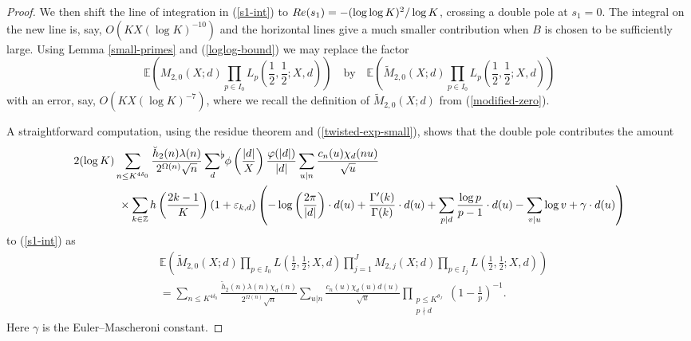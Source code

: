 \documentclass[10pt,a4paper]{amsart}
\renewcommand{\Re}{\textnormal{Re}}
\newcommand\Z{\mathbb{Z}}
\newcommand\eps{\varepsilon}
\newcommand{\sumflat}{\mathop{{\sum}^{\raisebox{-3pt}{\makebox[0pt][l]{$\flat$}}}}}
\begin{document}
\begin{proof}
We then shift the line of integration in (\ref{s1-int}) to $\Re(s_1)=-(\log\log K)^2/\log K$, crossing a double pole at $s_1=0$. The integral on the new line is, say, $O(KX(\log K)^{-10})$ and the horizontal lines give a much smaller contribution when $B$ is chosen to be sufficiently large. Using Lemma \ref{small-primes} and (\ref{loglog-bound}) we may replace the factor 
\[ 
\mathbb E\left(M_{2,0}(X;d)\prod_{p\in I_0}L_p\left(\frac12,\frac12;X,d\right)\right) \quad\text{by}\quad \mathbb E\left(\widetilde M_{2,0}(X;d)\prod_{p\in I_0}L_p\left(\frac12,\frac12;X,d\right)\right)
\]
with an error, say, $O(KX(\log K)^{-7})$, where we recall the definition of $\widetilde M_{2,0}(X;d)$ from (\ref{modified-zero}).

A straightforward computation, using the residue theorem and (\ref{twisted-exp-small}), shows that the double pole contributes the amount
\begin{align*}
&2(\log K)\sum_{n\leq K^{4\delta_0}}\frac{\breve h_2(n)\lambda(n)}{2^{\Omega(n)}\sqrt n}\sumflat_{d}\,\phi\left(\frac{|d|}X\right)\frac{\varphi(|d|)}{|d|}\sum_{u|n}\frac{c_n(u)\chi_d(nu)}{\sqrt u}\\
&\qquad\qquad\times\sum_{k\in\Z}h\left(\frac{2k-1}K\right)(1+\eps_{k,d})\left(-\log\left(\frac{2\pi}{|d|}\right)\cdot d(u)+\frac{\Gamma'(k)}{\Gamma(k)}\cdot d(u)+\sum_{p|d}\frac{\log p}{p-1}\cdot d(u)-\sum_{v|u}\log v+\gamma\cdot d(u)\right)
\end{align*} 
to (\ref{s1-int}) as
\begin{align*}
&\mathbb E\left(\widetilde M_{2,0}(X;d)\prod_{p\in I_0}L\left(\frac12,\frac12;X,d\right)\prod_{j=1}^J M_{2,j}(X;d)\prod_{p\in I_j}L\left(\frac12,\frac12;X,d\right)\right)\\
&=\sum_{n\leq K^{4\delta_0}}\frac{\widetilde h_2(n)\lambda(n)\chi_d(n)}{2^{\Omega(n)}\sqrt n}\sum_{u|n}\frac{c_n(u)\chi_d(u)d(u)}{\sqrt u}\prod_{\substack{p\leq K^{\theta_J}\\
p\nmid d}}\left(1-\frac1p\right)^{-1}.
\end{align*}
Here $\gamma$ is the Euler--Mascheroni constant. 


\end{proof}
\end{document}
